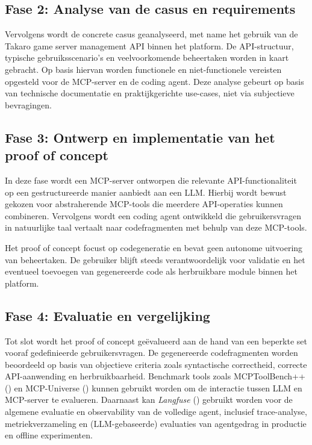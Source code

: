 \subsection{Fase 2: Analyse van de casus en requirements}

Vervolgens wordt de concrete casus geanalyseerd, met name het gebruik van de Takaro game server management API binnen het platform. De API-structuur, typische gebruiksscenario’s en veelvoorkomende beheertaken worden in kaart gebracht. Op basis hiervan worden functionele en niet-functionele vereisten opgesteld voor de MCP-server en de coding agent. Deze analyse gebeurt op basis van technische documentatie en praktijkgerichte use-cases, niet via subjectieve bevragingen.


\subsection{Fase 3: Ontwerp en implementatie van het proof of concept}

In deze fase wordt een MCP-server ontworpen die relevante API-functionaliteit op een gestructureerde manier aanbiedt aan een LLM. Hierbij wordt bewust gekozen voor abstraherende MCP-tools die meerdere API-operaties kunnen combineren. Vervolgens wordt een coding agent ontwikkeld die gebruikersvragen in natuurlijke taal vertaalt naar codefragmenten met behulp van deze MCP-tools.

Het proof of concept focust op codegeneratie en bevat geen autonome uitvoering van beheertaken. De gebruiker blijft steeds verantwoordelijk voor validatie en het eventueel toevoegen van gegenereerde code als herbruikbare module binnen het platform.


\subsection{Fase 4: Evaluatie en vergelijking}

Tot slot wordt het proof of concept geëvalueerd aan de hand van een beperkte set vooraf gedefinieerde gebruikersvragen. 
De gegenereerde codefragmenten worden beoordeeld op basis van objectieve criteria zoals syntactische correctheid, correcte API-aanwending en herbruikbaarheid. 
Benchmark tools zoals MCPToolBench++ (\cite{Fan2025MCPToolBenchPP}) en MCP-Universe (\cite{Luo2025MCPUniverse}) kunnen gebruikt worden om de interactie tussen LLM en MCP-server te evalueren. 
Daarnaast kan \textit{Langfuse} (\cite{langfuse_evaluation}) gebruikt worden voor de algemene evaluatie en observability van de volledige agent, inclusief trace-analyse, metriekverzameling en (LLM-gebaseerde) evaluaties van agentgedrag in productie en offline experimenten.


